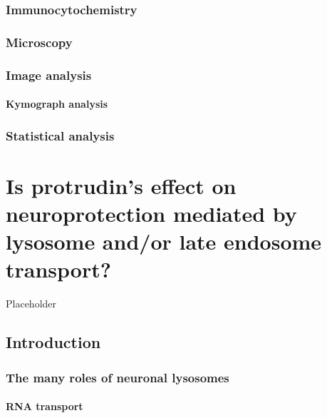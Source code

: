 \documentclass[
  12pt,
  a4paper,
]{book}
\begin{document}
\hypertarget{immuno}{%
\subsection{Immunocytochemistry}\label{immuno}}

\hypertarget{microscopy}{%
\subsection{Microscopy}\label{microscopy}}

\hypertarget{image-analysis}{%
\subsection{Image analysis}\label{image-analysis}}

\hypertarget{kymo}{%
\subsubsection{Kymograph analysis}\label{kymo}}

\hypertarget{statistical-analysis}{%
\subsection{Statistical analysis}\label{statistical-analysis}}

\hypertarget{is-protrudins-effect-on-neuroprotection-mediated-by-lysosome-andor-late-endosome-transport}{%
\chapter{Is protrudin's effect on neuroprotection mediated by lysosome and/or late endosome transport?}\label{is-protrudins-effect-on-neuroprotection-mediated-by-lysosome-andor-late-endosome-transport}}

Placeholder

\hypertarget{introduction}{%
\section{Introduction}\label{introduction}}

\hypertarget{the-many-roles-of-neuronal-lysosomes}{%
\subsection{The many roles of neuronal lysosomes}\label{the-many-roles-of-neuronal-lysosomes}}

\hypertarget{rna-transport}{%
\subsubsection{RNA transport}\label{rna-transport}}
\end{document}
